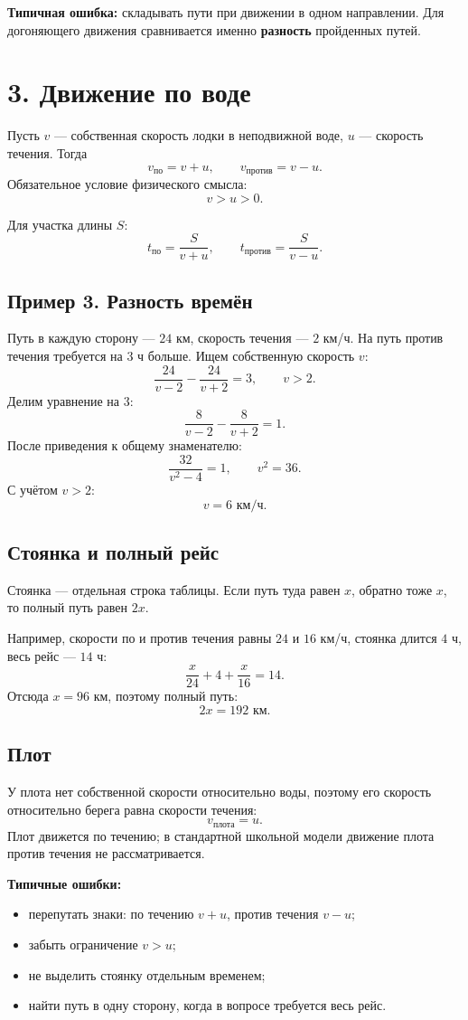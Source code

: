 \documentclass[a4paper,12pt]{article}
\begin{document}
\textbf{Типичная ошибка:} складывать пути при движении в одном направлении. Для догоняющего движения сравнивается именно \textbf{разность} пройденных путей.

\section*{3. Движение по воде}

Пусть \(v\) — собственная скорость лодки в неподвижной воде, \(u\) — скорость течения. Тогда
\[
v_{\text{по}}=v+u,
\qquad
v_{\text{против}}=v-u.
\]
Обязательное условие физического смысла:
\[
v>u>0.
\]

Для участка длины \(S\):
\[
t_{\text{по}}=\frac{S}{v+u},
\qquad
t_{\text{против}}=\frac{S}{v-u}.
\]

\subsection*{Пример 3. Разность времён}
Путь в каждую сторону — \(24\) км, скорость течения — \(2\) км/ч. На путь против течения требуется на \(3\) ч больше. Ищем собственную скорость \(v\):
\[
\frac{24}{v-2}-\frac{24}{v+2}=3,
\qquad v>2.
\]
Делим уравнение на \(3\):
\[
\frac{8}{v-2}-\frac{8}{v+2}=1.
\]
После приведения к общему знаменателю:
\[
\frac{32}{v^2-4}=1,
\qquad v^2=36.
\]
С учётом \(v>2\):
\[
\boxed{v=6\text{ км/ч}}.
\]

\subsection*{Стоянка и полный рейс}
Стоянка — отдельная строка таблицы. Если путь туда равен \(x\), обратно тоже \(x\), то полный путь равен \(2x\).

Например, скорости по и против течения равны \(24\) и \(16\) км/ч, стоянка длится \(4\) ч, весь рейс — \(14\) ч:
\[
\frac{x}{24}+4+\frac{x}{16}=14.
\]
Отсюда \(x=96\) км, поэтому полный путь:
\[
\boxed{2x=192\text{ км}}.
\]

\subsection*{Плот}
У плота нет собственной скорости относительно воды, поэтому его скорость относительно берега равна скорости течения:
\[
v_{\text{плота}}=u.
\]
Плот движется по течению; в стандартной школьной модели движение плота против течения не рассматривается.

\textbf{Типичные ошибки:}
\begin{itemize}
  \item перепутать знаки: по течению \(v+u\), против течения \(v-u\);
  \item забыть ограничение \(v>u\);
  \item не выделить стоянку отдельным временем;
  \item найти путь в одну сторону, когда в вопросе требуется весь рейс.
\end{itemize}
\end{document}
